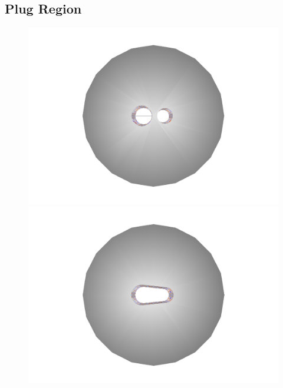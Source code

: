 \documentclass{report}
\begin{document}
            \subsection{Plug Region}
                \begin{figure}[h]
                    \centering
                    \begin{minipage}{0.3\textwidth}
                        \includegraphics[width=\textwidth]{beamcal_plug}
                    \end{minipage}
                    \begin{minipage}{0.3\textwidth}
                        \includegraphics[width=\textwidth]{beamcal_wedge}

\end{minipage}
\end{figure}
\end{document}
